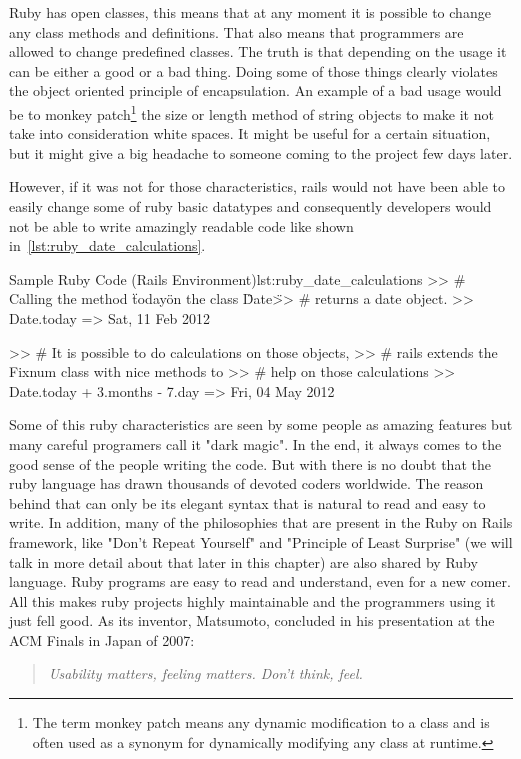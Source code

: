 Ruby has open classes, this means that at any moment it is possible to change 
any class methods and definitions. That also means that programmers are allowed to change predefined classes.
The truth is that depending on the usage it can be either a good or a bad thing.
Doing some of those things clearly violates the object oriented principle of encapsulation. 
An example of a bad usage would be to 
\textsf{monkey patch}\footnote{
  The term monkey patch means any dynamic modification to a class and 
  is often used as a synonym for dynamically modifying any class at runtime.
} 
the size or length method of string objects to make it not take into consideration white spaces.
It might be useful for a certain situation, 
but it might give a big headache to someone coming to the project few days later.

However, if it was not for those characteristics, 
rails would not have been able to easily change some of ruby basic datatypes and 
consequently developers would not be able to write amazingly readable code like shown in~\ref{lst:ruby_date_calculations}.

\begin{rubycode}{Sample Ruby Code (Rails Environment)}{lst:ruby_date_calculations}
  >> # Calling the method \"today\" on the class \"Date\" 
  >> # returns a date object.
  >> Date.today 
  => Sat, 11 Feb 2012

  >> # It is possible to do calculations on those objects, 
  >> # rails extends the Fixnum class with nice methods to 
  >> # help on those calculations
  >> Date.today + 3.months - 7.day
  => Fri, 04 May 2012
\end{rubycode}

Some of this ruby characteristics are seen by some people as amazing features 
but many careful programers call it "dark magic". In the end, it always comes to the 
good sense of the people writing the code. But with there is no doubt that 
the ruby language has drawn thousands of devoted coders worldwide.
The reason behind that can only be its elegant syntax that is natural to read and easy to write. 
In addition, many of the philosophies that are present in the Ruby on Rails framework,
like "Don't Repeat Yourself" and "Principle of Least Surprise" (we will talk in more detail about that later in this chapter) 
are also shared by Ruby language.
Ruby programs are easy to read and understand, even for a new comer. 
All this makes ruby projects highly maintainable and the programmers using it just fell good.
As its inventor, Matsumoto, concluded in his presentation at the ACM Finals in Japan of 2007: 
\begin{quote}\emph{
  Usability matters, feeling matters. Don't think, feel.
}\end{quote}




